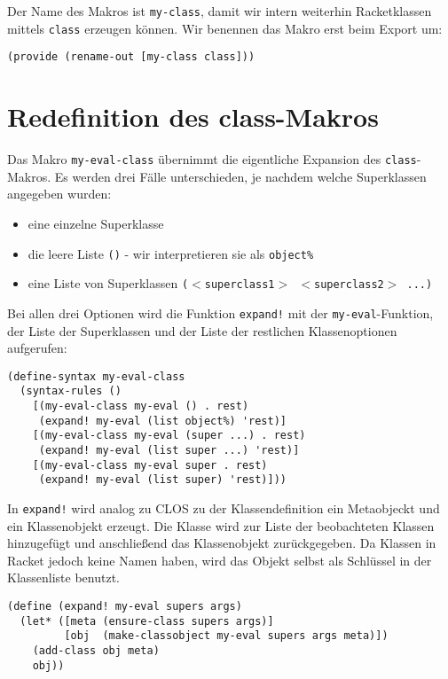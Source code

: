 Der Name des Makros ist \texttt{my-class}, damit wir intern weiterhin Racketklassen mittels \texttt{class} erzeugen können. Wir benennen das Makro erst beim Export um:

\begin{lstlisting}
(provide (rename-out [my-class class]))
\end{lstlisting}

\section{Redefinition des class-Makros}
Das Makro \texttt{my-eval-class} übernimmt die eigentliche Expansion des \texttt{class}-Makros. Es werden drei Fälle unterschieden, je nachdem welche Superklassen angegeben wurden:
\begin{itemize}
 \item eine einzelne Superklasse 
 \item die leere Liste \texttt{()} - wir interpretieren sie als \texttt{object\%}
 \item eine Liste von Superklassen \texttt{($<$superclass1$>$ $<$superclass2$>$ ...)}
\end{itemize}

Bei allen drei Optionen wird die Funktion \texttt{expand!} mit der \texttt{my-eval}-Funktion, der Liste der Superklassen und der Liste der restlichen Klassenoptionen aufgerufen:

\begin{lstlisting}
(define-syntax my-eval-class
  (syntax-rules ()
    [(my-eval-class my-eval () . rest) 
     (expand! my-eval (list object%) 'rest)]
    [(my-eval-class my-eval (super ...) . rest)
     (expand! my-eval (list super ...) 'rest)]
    [(my-eval-class my-eval super . rest)
     (expand! my-eval (list super) 'rest)]))
\end{lstlisting}

In \texttt{expand!} wird analog zu CLOS zu der Klassendefinition ein Metaobjeckt und ein Klassenobjekt erzeugt. Die Klasse wird zur Liste der beobachteten Klassen hinzugefügt und anschließend das Klassenobjekt zurückgegeben. Da Klassen in Racket jedoch keine Namen haben, wird das Objekt selbst als Schlüssel in der Klassenliste benutzt.

\begin{lstlisting}
(define (expand! my-eval supers args)
  (let* ([meta (ensure-class supers args)]
         [obj  (make-classobject my-eval supers args meta)])
    (add-class obj meta)
    obj))
\end{lstlisting}

